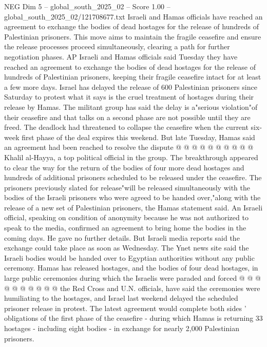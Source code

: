 \begin{textsample}{NEG Dim 5 – global\_south\_2025\_02 – Score 1.00 – global\_south\_2025\_02/121708677.txt}  \label{ex:f5_neg_249}
Israeli and Hamas officials have reached an agreement to exchange the bodies of dead hostages for the release of hundreds of Palestinian prisoners.
This move aims to maintain the fragile ceasefire and ensure the release processes proceed simultaneously, clearing a path for further negotiation phases.
AP Israeli and Hamas officials said Tuesday they have reached an agreement to exchange the bodies of dead hostages for the release of hundreds of Palestinian prisoners, keeping their fragile ceasefire intact for at least a few more days.
Israel has delayed the release of 600 Palestinian prisoners since Saturday to protest what it says is the cruel treatment of hostages during their release by Hamas.
The militant group has said the delay is a"serious violation"of their ceasefire and that talks on a second phase are not possible until they are freed.
The deadlock had threatened to collapse the ceasefire when the current six-week first phase of the deal expires this weekend.
But late Tuesday, Hamas said an agreement had been reached to resolve the dispute @ @ @ @ @ @ @ @ @ @ Khalil al-Hayya, a top political official in the group.
The breakthrough appeared to clear the way for the return of the bodies of four more dead hostages and hundreds of additional prisoners scheduled to be released under the ceasefire.
The prisoners previously slated for release"will be released simultaneously with the bodies of the Israeli prisoners who were agreed to be handed over,"along with the release of a new set of Palestinian prisoners, the Hamas statement said.
An Israeli official, speaking on condition of anonymity because he was not authorized to speak to the media, confirmed an agreement to bring home the bodies in the coming days.
He gave no further details.
But Israeli media reports said the exchange could take place as soon as Wednesday.
The Ynet news site said the Israeli bodies would be handed over to Egyptian authorities without any public ceremony.
Hamas has released hostages, and the bodies of four dead hostages, in large public ceremonies during which the Israelis were paraded and forced @ @ @ @ @ @ @ @ @ @ the Red Cross and U.N. officials, have said the ceremonies were humiliating to the hostages, and Israel last weekend delayed the scheduled prisoner release in protest.
The latest agreement would complete both sides ' obligations of the first phase of the ceasefire - during which Hamas is returning 33 hostages - including eight bodies - in exchange for nearly 2,000 Palestinian prisoners.

\end{textsample}
